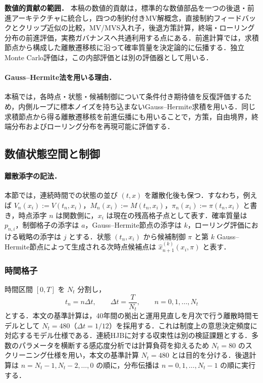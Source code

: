 \documentclass[10pt,a4paper]{article}
\theoremstyle{plain}
\theoremstyle{definition}
\begin{document}
\noindent\textbf{数値的貢献の範囲．}
本稿の数値的貢献は，標準的な数値部品を一つの後退・前進アーキテクチャに統合し，四つの制約付きMV解概念，直接制約フィードバックとクリップ近似の比較，MV/MVS入れ子，後退方策計算，終端・ローリング分布の前進評価，実務ガバナンスへ共通利用する点にある．前進計算では，求積節点から構成した離散遷移核に沿って確率質量を決定論的に伝播する．独立Monte Carlo評価は，この内部評価とは別の評価器として用いる．

\paragraph{Gauss--Hermite法を用いる理由．}
本稿では，各時点・状態・候補制御について条件付き期待値を反復評価するため，内側ループに標本ノイズを持ち込まないGauss--Hermite求積を用いる．同じ求積節点から得る離散遷移核を前進伝播にも用いることで，方策，自由境界，終端分布およびローリング分布を再現可能に評価する．

\subsection{数値状態空間と制御}
\label{sec:grid}

\paragraph{離散添字の記法．}
本節では，連続時間での状態の並び $(t,x)$ を離散化後も保つ．すなわち，例えば $V_n(x_i):=V(t_n,x_i)$，$M_n(x_i):=M(t_n,x_i)$，$\pi_n(x_i):=\pi(t_n,x_i)$ と書き，時点添字 $n$ は関数側に，$x_i$ は現在の残高格子点として表す．確率質量は $p_{n,i}$，制御格子の添字は $a$，Gauss--Hermite節点の添字は $k$，ローリング評価における戦略の添字は $j$ とする．状態 $(t_n,x_i)$ から候補制御 $\pi$ と第 $k$ Gauss--Hermite節点によって生成される次時点候補点は $\widehat{x}_{n+1}^{(k)}(x_i,\pi)$ と表す．

\subsubsection{時間格子}

時間区間 $[0,T]$ を $N_t$ 分割し，
\begin{equation}
  t_n=n\Delta t,
  \qquad
  \Delta t=\frac{T}{N_t},
  \qquad n=0,1,\ldots,N_t
  \label{eq:time-grid}
\end{equation}
とする．本文の基準計算は，40年間の拠出と運用見直しを月次で行う離散時間モデルとして $N_t=480$（$\Delta t=1/12$）を採用する．これは制度上の意思決定頻度に対応するモデル仕様である．連続HJBに対する収束性は別の検証課題とする．多数のパラメータを横断する感応度分析では計算負荷を抑えるため $N_t=80$ のスクリーニング仕様を用い，本文の基準計算 $N_t=480$ とは目的を分ける．後退計算は $n=N_t-1,N_t-2,\ldots,0$ の順に，分布伝播は $n=0,1,\ldots,N_t-1$ の順に実行する．
\end{document}
